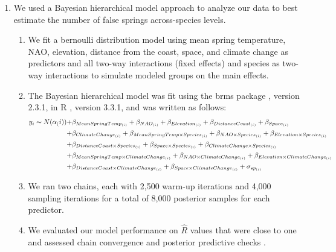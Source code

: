 \documentclass{article}\usepackage[]{graphicx}\usepackage[]{color}
\begin{document}
\begin{enumerate}
\item We used a Bayesian hierarchical model approach to analyze our data to best estimate the number of false springs across-species levels. 
\begin{enumerate}
\item We fit a bernoulli distribution model using mean spring temperature, NAO, elevation, distance from the coast, space, and climate change as predictors and all two-way interactions (fixed effects) and species as two-way interactions to simulate modeled groups on the main effects.
\item The Bayesian hierarchical model was fit using the brms package \citep{brms}, version 2.3.1,  in R \citep{R}, version 3.3.1, and was written as follows: 
\begin{align*} \label{eq:1} %
y_i \thicksim N(\alpha_(i)) +& \beta_{MeanSpringTemp_{(i)}} + \beta_{NAO_{(i)}}+ \beta_{Elevation_{(i)}} + \beta_{DistanceCoast_{(i)}} + \beta_{Space_{(i)}} \\ +& \beta_{ClimateChange_{(i)}}
+ \beta_{MeanSpringTemp \times Species_{(i)}} + \beta_{NAO \times Species_{(i)}}+ \beta_{Elevation \times Species_{(i)}} \\ +& \beta_{DistanceCoast \times Species_{(i)}} + \beta_{Space \times Species_{(i)}} + \beta_{ClimateChange \times Species_{(i)}} \\
+& \beta_{MeanSpringTemp \times ClimateChange_{(i)}} + \beta_{NAO \times ClimateChange_{(i)}}
+ \beta_{Elevation \times ClimateChange_{(i)}} \\ +& \beta_{DistanceCoast \times ClimateChange_{(i)}} + \beta_{Space \times ClimateChange_{(i)}} + \sigma_{sp_{(i)}} 
\end{align*}
\item We ran two chains, each with 2,500 warm-up iterations and 4,000 sampling iterations for a total of 8,000 posterior samples for each predictor. 
\item We evaluated our model performance on $\hat{R}$ values that were close to one and assessed chain convergence and posterior predictive checks \citep{Gelman2006}.
\end{enumerate}
\end{enumerate}
\end{document}

